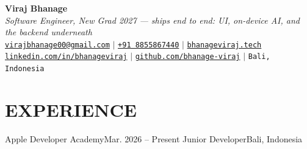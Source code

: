 


\begin{center}
    \textbf{\Huge Viraj Bhanage} \\ \vspace{4pt}
    {\small\textit{Software Engineer, New Grad 2027 --- ships end to end: UI, on-device AI, and the backend underneath}} \\ \vspace{4pt}
    \small
    \faEnvelope \hspace{2pt} \href{mailto:virajbhanage00@gmail.com}{\texttt{virajbhanage00@gmail.com}} \hspace{1pt} $|$
    \hspace{1pt} \faPhone \hspace{2pt} \href{tel:+918855867440}{\texttt{+91 8855867440}} \hspace{1pt} $|$
    \hspace{1pt} \href{https://www.bhanageviraj.tech}{\texttt{bhanageviraj.tech}} \\
    \faLinkedin \hspace{2pt} \href{https://www.linkedin.com/in/bhanageviraj/}{\texttt{linkedin.com/in/bhanageviraj}} \hspace{1pt} $|$
    \hspace{1pt} \faGithub \hspace{2pt} \href{https://github.com/bhanage-viraj}{\texttt{github.com/bhanage-viraj}} \hspace{1pt} $|$
    \hspace{1pt} \faMapMarker* \hspace{2pt}\texttt{Bali, Indonesia}
\end{center}

\section{EXPERIENCE}
  \resumeSubHeadingListStart
    \resumeSubheading
      {Apple Developer Academy}{Mar. 2026 -- Present}
      {Junior Developer}{Bali, Indonesia}
      \resumeItemListStart
      \resumeItemListEnd
  \resumeSubHeadingListEnd

